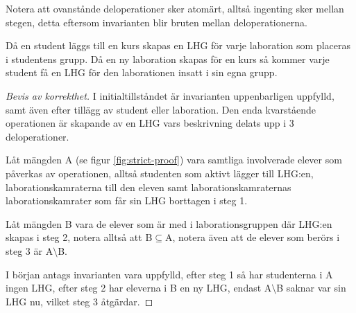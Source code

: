 Notera att ovanstånde deloperationer sker atomärt, alltså ingenting sker mellan stegen, detta eftersom invarianten blir bruten mellan deloperationerna.

Då en student läggs till en kurs skapas en LHG för varje laboration som placeras i studentens grupp. Då en ny laboration skapas för en kurs så kommer varje student få en LHG för den laborationen insatt i sin egna grupp.

\begin{proof}[Bevis av korrekthet]
I initialtillståndet är invarianten uppenbarligen uppfylld, samt även efter tillägg av student eller laboration. Den enda kvarstående operationen är skapande av en LHG vars beskrivning delats upp i 3 deloperationer. 

Låt mängden A (se figur \ref{fig:strict-proof}) vara samtliga involverade elever som påverkas av operationen, alltså studenten som aktivt lägger till LHG:en, laborationskamraterna till den eleven samt laborationskamraternas laborationskamrater som får sin LHG borttagen i steg 1. 

Låt mängden B vara de elever som är med i laborationsgruppen där LHG:en skapas i steg 2, notera alltså att B$\subseteq$A, notera även att de elever som berörs i steg 3 är A$\setminus$B.

I början antags invarianten vara uppfylld, efter steg 1 så har studenterna i A ingen LHG, efter steg 2 har eleverna i B en ny LHG, endast A$\setminus$B saknar var sin LHG nu, vilket steg 3 åtgärdar. \qedhere
\end{proof}
 
